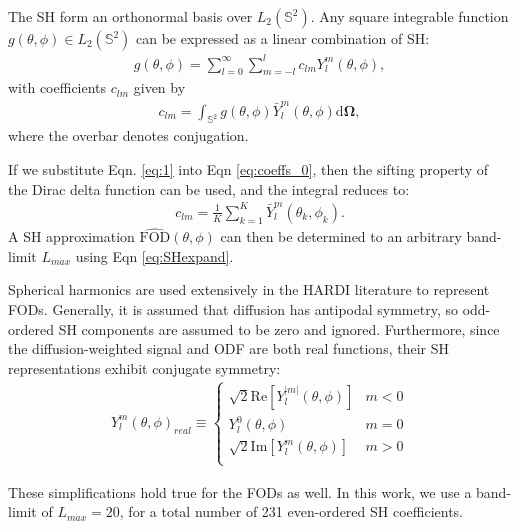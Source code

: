 \documentclass{article}
\begin{document}
The SH form an orthonormal basis over $L_2(\mathbb{S}^2)$. Any
square integrable function $g(\theta, \phi) \in L_2(\mathbb{S}^2)$ can
be expressed as a linear combination of SH:
\begin{align}
  g(\theta, \phi) = \sum_{l=0}^{\infty}\sum_{m=-l}^l c_{lm}Y_l^m(\theta, \phi),
  \label{eq:SHexpand}
\end{align}
with coefficients $c_{lm}$ given by
\begin{align}
  c_{lm} = \int_{\mathbb{S}^2} g(\theta, \phi) \bar{Y}_l^m(\theta, \phi) \mathrm{d}\bm{\Omega},
  \label{eq:coeffs_0}
\end{align}
where the overbar denotes conjugation.

If we substitute Eqn. \ref{eq:1} into Eqn \ref{eq:coeffs_0}, then the sifting property of the Dirac
delta function can be used, and the integral reduces to:
\begin{align}
  c_{lm} = \frac{1}{K}\sum_{k=1}^K \bar{Y}_l^m(\theta_k, \phi_k).
  \label{eq:get_coeffs}
\end{align}
A SH approximation $\hat{\text{FOD}}(\theta, \phi)$ can then be determined to an arbitrary
band-limit $L_{max}$ using Eqn \ref{eq:SHexpand}.

Spherical harmonics are used extensively in the HARDI literature to represent
FODs. Generally, it is assumed that diffusion has antipodal
symmetry, so odd-ordered SH components are assumed to be zero and
ignored. Furthermore, since the diffusion-weighted signal and ODF are both real
functions, their SH representations exhibit conjugate symmetry:
\begin{align}
  Y_{l}^m(\theta, \phi)_{real} \equiv
  \begin{cases}
    \sqrt{2}\text{Re}\left[Y_l^{|m|}(\theta, \phi)\right] & m < 0\\
    Y_l^0(\theta, \phi) & m = 0\\
    \sqrt{2}\text{Im}\left[Y_l^m(\theta, \phi)\right] & m > 0\\
  \end{cases}
  \label{eq:real_Y}
\end{align}

These simplifications hold true for the \uct FODs as well. In this work, we use a
band-limit of $L_{max} = 20$, for a total number of 231 even-ordered SH coefficients.
\end{document}
